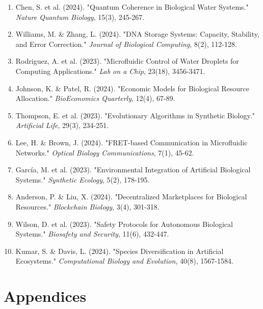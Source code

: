 \documentclass[11pt,a4paper]{article}
\begin{document}
\begin{enumerate}
    \item Chen, S. et al. (2024). "Quantum Coherence in Biological Water Systems." \textit{Nature Quantum Biology}, 15(3), 245-267.
    
    \item Williams, M. \& Zhang, L. (2024). "DNA Storage Systems: Capacity, Stability, and Error Correction." \textit{Journal of Biological Computing}, 8(2), 112-128.
    
    \item Rodriguez, A. et al. (2023). "Microfluidic Control of Water Droplets for Computing Applications." \textit{Lab on a Chip}, 23(18), 3456-3471.
    
    \item Johnson, K. \& Patel, R. (2024). "Economic Models for Biological Resource Allocation." \textit{BioEconomics Quarterly}, 12(4), 67-89.
    
    \item Thompson, E. et al. (2023). "Evolutionary Algorithms in Synthetic Biology." \textit{Artificial Life}, 29(3), 234-251.
    
    \item Lee, H. \& Brown, J. (2024). "FRET-based Communication in Microfluidic Networks." \textit{Optical Biology Communications}, 7(1), 45-62.
    
    \item García, M. et al. (2023). "Environmental Integration of Artificial Biological Systems." \textit{Synthetic Ecology}, 5(2), 178-195.
    
    \item Anderson, P. \& Liu, X. (2024). "Decentralized Marketplaces for Biological Resources." \textit{Blockchain Biology}, 3(4), 301-318.
    
    \item Wilson, D. et al. (2023). "Safety Protocols for Autonomous Biological Systems." \textit{Biosafety and Security}, 11(6), 432-447.
    
    \item Kumar, S. \& Davis, L. (2024). "Species Diversification in Artificial Ecosystems." \textit{Computational Biology and Evolution}, 40(8), 1567-1584.
\end{enumerate}

\newpage

\section{Appendices}
\end{document}
